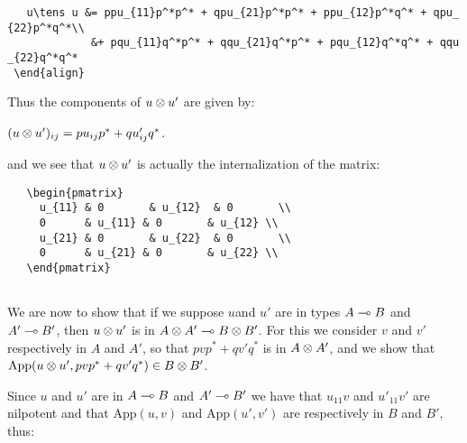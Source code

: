 \texttt{~~~u\textbackslash{}tens~u\textquotesingle{}~\&=~ppu\_\{11\}p\^{}*p\^{}*~+~qpu\_\{21\}p\^{}*p\^{}*~+~ppu\_\{12\}p\^{}*q\^{}*~+~qpu\_\{22\}p\^{}*q\^{}*\textbackslash{}\textbackslash{}}\\
\texttt{~~~~~~~~~~~~~\&+~pqu\textquotesingle{}\_\{11\}q\^{}*p\^{}*~+~qqu\textquotesingle{}\_\{21\}q\^{}*p\^{}*~+~pqu\textquotesingle{}\_\{12\}q\^{}*q\^{}*~+~qqu\textquotesingle{}\_\{22\}q\^{}*q\^{}*}\\
\texttt{~\textbackslash{}end\{align\}}

Thus the components of \(u\otimes u'\) are given by:

\begin{description}
\tightlist
\item[]
\((u\otimes u')_{ij} = pu_{ij}p^* + qu'_{ij}q^*\).
\end{description}

and we see that \(u\otimes u'\) is actually the internalization of the
matrix:

\begin{description}
\tightlist
\item[]
\end{description}

\texttt{~~~\textbackslash{}begin\{pmatrix\}}\\
\texttt{~~~~~u\_\{11\}~\&~0~~~~~~~\&~u\_\{12\}~~\&~0~~~~~~~\textbackslash{}\textbackslash{}}\\
\texttt{~~~~~0~~~~~~\&~u\textquotesingle{}\_\{11\}~\&~0~~~~~~~\&~u\textquotesingle{}\_\{12\}~\textbackslash{}\textbackslash{}}\\
\texttt{~~~~~u\_\{21\}~\&~0~~~~~~~\&~u\_\{22\}~~\&~0~~~~~~~\textbackslash{}\textbackslash{}}\\
\texttt{~~~~~0~~~~~~\&~u\textquotesingle{}\_\{21\}~\&~0~~~~~~~\&~u\textquotesingle{}\_\{22\}~\textbackslash{}\textbackslash{}}\\
\texttt{~~~\textbackslash{}end\{pmatrix\}}\\
\texttt{~}

We are now to show that if we suppose \(u\)and \(u'\) are in types
\(A\multimap B\) and \(A'\multimap B'\), then \(u\otimes u'\) is in
\(A\otimes A'\multimap B\otimes B'\). For this we consider \(v\) and \(v'\)
respectively in \(A\) and \(A'\), so that \(pvp^* + qv'q^*\) is in
\(A\otimes A'\), and we show that
\(\mathrm{App}(u\otimes u', pvp^* + qv'q^*)\in B\otimes B'\).

Since \(u\) and \(u'\) are in \(A\multimap B\) and \(A'\multimap B'\) we have
that \(u_{11}v\) and \(u'_{11}v'\) are nilpotent and that
\(\mathrm{App}(u, v)\) and \(\mathrm{App}(u', v')\) are respectively in
\(B\) and \(B'\), thus:

